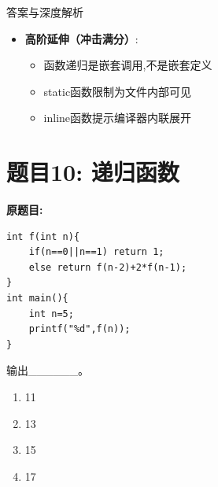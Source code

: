 \documentclass[a4paper,12pt]{article}
\begin{document}
\begin{bluebox}{答案与深度解析}
\begin{itemize}[leftmargin=*, nosep]
		\item \textbf{高阶延伸（冲击满分）}:
		      \begin{itemize}
			      \item 函数递归是嵌套调用,不是嵌套定义
			      \item static函数限制为文件内部可见
			      \item inline函数提示编译器内联展开
		      \end{itemize}
	\end{itemize}
\end{bluebox}

\vspace{1cm}

\section*{题目10: 递归函数}

\textbf{原题目:}
\begin{verbatim}
int f(int n){
    if(n==0||n==1) return 1;
    else return f(n-2)+2*f(n-1);
}
int main(){
    int n=5;
    printf("%d",f(n));
}
\end{verbatim}
输出\_\_\_\_\_\_。
\begin{enumerate}
	\item[A)] 11
	\item[B)] 13
	\item[C)] 15
	\item[D)] 17
\end{enumerate}
\end{document}
